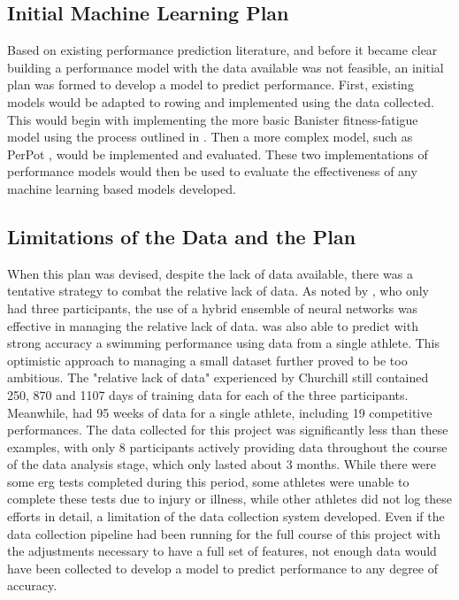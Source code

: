 \subsection{Initial Machine Learning Plan}
Based on existing performance prediction literature, and before it became clear building a performance model with the data available was not feasible, an initial plan was formed to develop a model to predict performance. First, existing models would be adapted to rowing and implemented using the data collected. This would begin with implementing the more basic Banister fitness-fatigue model using the process outlined in \textcite{Morton1990}. Then a more complex model, such as PerPot \cite{perl2001}, would be implemented and evaluated. These two implementations of performance models would then be used to evaluate the effectiveness of any machine learning based models developed.

\subsection{Limitations of the Data and the Plan}
When this plan was devised, despite the lack of data available, there was a tentative strategy to combat the relative lack of data. As noted by \textcite{Churchill2014}, who only had three participants, the use of a hybrid ensemble of neural networks was effective in managing the relative lack of data. \textcite{Edelmannnusser2002} was also able to predict with strong accuracy a swimming performance using data from a single athlete. This optimistic approach to managing a small dataset further proved to be too ambitious. The "relative lack of data" experienced by Churchill still contained 250, 870 and 1107 days of training data for each of the three participants. Meanwhile, \textcite{Edelmannnusser2002} had 95 weeks of data for a single athlete, including 19 competitive performances. The data collected for this project was significantly less than these examples, with only 8 participants actively providing data throughout the course of the data analysis stage, which only lasted about 3 months. While there were some erg tests completed during this period, some athletes were unable to complete these tests due to injury or illness, while other athletes did not log these efforts in detail, a limitation of the data collection system developed. Even if the data collection pipeline had been running for the full course of this project with the adjustments necessary to have a full set of features, not enough data would have been collected to develop a model to predict performance to any degree of accuracy.

